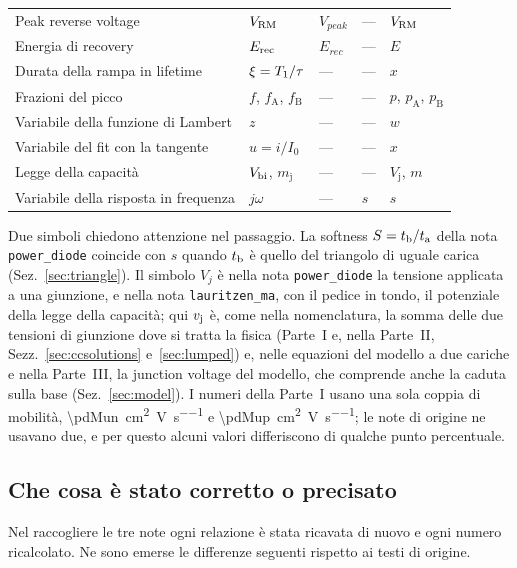 \documentclass[10pt,a4paper]{scrartcl}
\let\newcommand\pdvaluedefine
\newcommand{\ta}{t_\mathrm{a}}
\newcommand{\tb}{t_\mathrm{b}}
\newcommand{\Tone}{T_1}
\newcommand{\vj}{v_\mathrm{j}}
\newcommand{\Vrm}{V_\mathrm{RM}}
\newcommand{\Vbi}{V_\mathrm{bi}}
\newcommand{\Erec}{E_\mathrm{rec}}
\begin{document}
\begin{table}[htb]
\begin{tabular}{@{}>{\raggedright\arraybackslash}p{4.3cm}llll@{}}
Peak reverse voltage & $\Vrm$ & $V_{peak}$ & --- & $\Vrm$ \\
Energia di recovery & $\Erec$ & $E_{rec}$ & --- & $E$ \\
Durata della rampa in lifetime & $\xi = \Tone/\tau$ & --- & --- & $x$ \\
Frazioni del picco & $f$, $f_\mathrm{A}$, $f_\mathrm{B}$ & --- & --- & $p$, $p_\mathrm{A}$, $p_\mathrm{B}$ \\
Variabile della funzione di Lambert & $z$ & --- & --- & $w$ \\
Variabile del fit con la tangente & $u = i/I_0$ & --- & --- & $x$ \\
Legge della capacità & $\Vbi$, $m_\mathrm{j}$ & --- & --- & $V_\mathrm{j}$, $m$ \\
Variabile della risposta in frequenza & $j\omega$ & --- & $s$ & $s$ \\
\bottomrule
\end{tabular}
\end{table}

Due simboli chiedono attenzione nel passaggio. La softness $S = \tb/\ta$ della nota \texttt{power\_diode} coincide con $s$ quando $\tb$ è quello del triangolo di uguale carica (Sez.~\ref{sec:triangle}). Il simbolo $V_j$ è nella nota \texttt{power\_diode} la tensione applicata a una giunzione, e nella nota \texttt{lauritzen\_ma}, con il pedice in tondo, il potenziale della legge della capacità; qui $\vj$ è, come nella nomenclatura, la somma delle due tensioni di giunzione dove si tratta la fisica (Parte~I e, nella Parte~II, Sezz.~\ref{sec:ccsolutions} e~\ref{sec:lumped}) e, nelle equazioni del modello a due cariche e nella Parte~III, la junction voltage del modello, che comprende anche la caduta sulla base (Sez.~\ref{sec:model}). I numeri della Parte~I usano una sola coppia di mobilità, \SI{\pdMun}{\centi\metre\squared\per\volt\per\second} e \SI{\pdMup}{\centi\metre\squared\per\volt\per\second}; le note di origine ne usavano due, e per questo alcuni valori differiscono di qualche punto percentuale.

\subsection{Che cosa è stato corretto o precisato}
Nel raccogliere le tre note ogni relazione è stata ricavata di nuovo e ogni numero ricalcolato. Ne sono emerse le differenze seguenti rispetto ai testi di origine.
\end{document}
